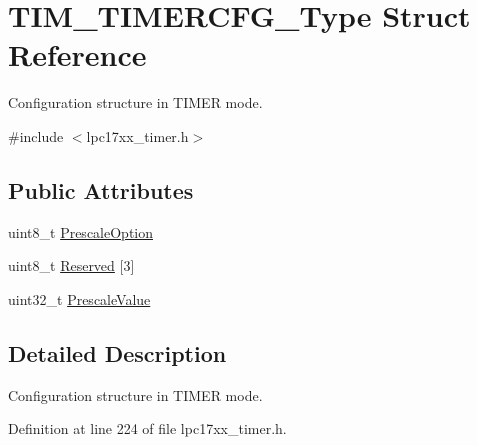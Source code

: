 \hypertarget{struct_t_i_m___t_i_m_e_r_c_f_g___type}{\section{\-T\-I\-M\-\_\-\-T\-I\-M\-E\-R\-C\-F\-G\-\_\-\-Type \-Struct \-Reference}
\label{struct_t_i_m___t_i_m_e_r_c_f_g___type}
}


\-Configuration structure in \-T\-I\-M\-E\-R mode.  




{\ttfamily \#include $<$lpc17xx\-\_\-timer.\-h$>$}

\subsection*{\-Public \-Attributes}
\begin{DoxyCompactItemize}
\item 
uint8\-\_\-t \hyperlink{struct_t_i_m___t_i_m_e_r_c_f_g___type_a0a8d60fc3231a6d3c71345778bd67ccc}{\-Prescale\-Option}
\item 
uint8\-\_\-t \hyperlink{struct_t_i_m___t_i_m_e_r_c_f_g___type_a7d22d4785d54ea3b663590d6295856fe}{\-Reserved} \mbox{[}3\mbox{]}
\item 
uint32\-\_\-t \hyperlink{struct_t_i_m___t_i_m_e_r_c_f_g___type_a899dc9dc69989b4b205c985c2f3e1c14}{\-Prescale\-Value}
\end{DoxyCompactItemize}


\subsection{\-Detailed \-Description}
\-Configuration structure in \-T\-I\-M\-E\-R mode. 

\-Definition at line 224 of file lpc17xx\-\_\-timer.\-h.



